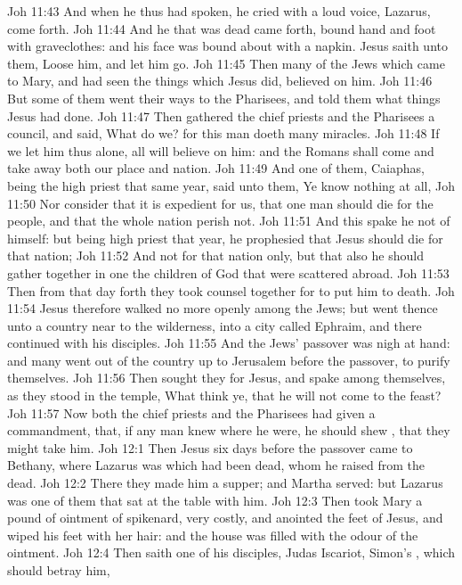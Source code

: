 \vs Joh 11:43 And when he thus had spoken, he cried with a loud voice, Lazarus, come forth.
\vs Joh 11:44 And he that was dead came forth, bound hand and foot with graveclothes: and his face was bound about with a napkin. Jesus saith unto them, Loose him, and let him go.
\vs Joh 11:45 Then many of the Jews which came to Mary, and had seen the things which Jesus did, believed on him.
\vs Joh 11:46 But some of them went their ways to the Pharisees, and told them what things Jesus had done.
\vs Joh 11:47 Then gathered the chief priests and the Pharisees a council, and said, What do we? for this man doeth many miracles.
\vs Joh 11:48 If we let him thus alone, all  will believe on him: and the Romans shall come and take away both our place and nation.
\vs Joh 11:49 And one of them,  Caiaphas, being the high priest that same year, said unto them, Ye know nothing at all,
\vs Joh 11:50 Nor consider that it is expedient for us, that one man should die for the people, and that the whole nation perish not.
\vs Joh 11:51 And this spake he not of himself: but being high priest that year, he prophesied that Jesus should die for that nation;
\vs Joh 11:52 And not for that nation only, but that also he should gather together in one the children of God that were scattered abroad.
\vs Joh 11:53 Then from that day forth they took counsel together for to put him to death.
\vs Joh 11:54 Jesus therefore walked no more openly among the Jews; but went thence unto a country near to the wilderness, into a city called Ephraim, and there continued with his disciples.
\vs Joh 11:55 And the Jews' passover was nigh at hand: and many went out of the country up to Jerusalem before the passover, to purify themselves.
\vs Joh 11:56 Then sought they for Jesus, and spake among themselves, as they stood in the temple, What think ye, that he will not come to the feast?
\vs Joh 11:57 Now both the chief priests and the Pharisees had given a commandment, that, if any man knew where he were, he should shew , that they might take him.
\vs Joh 12:1 Then Jesus six days before the passover came to Bethany, where Lazarus was which had been dead, whom he raised from the dead.
\vs Joh 12:2 There they made him a supper; and Martha served: but Lazarus was one of them that sat at the table with him.
\vs Joh 12:3 Then took Mary a pound of ointment of spikenard, very costly, and anointed the feet of Jesus, and wiped his feet with her hair: and the house was filled with the odour of the ointment.
\vs Joh 12:4 Then saith one of his disciples, Judas Iscariot, Simon's , which should betray him,
